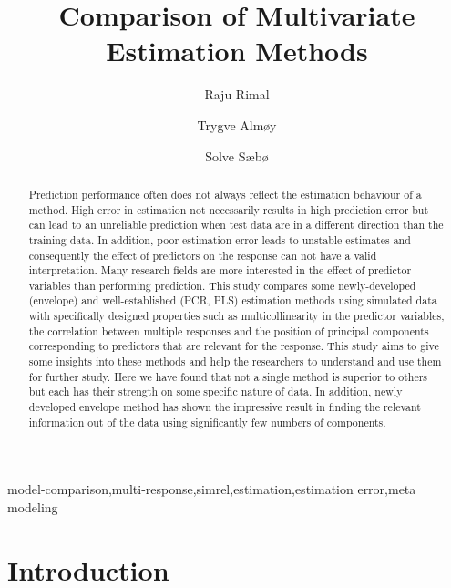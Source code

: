 \documentclass[12pt,3p,authoryear]{elsarticle}
\begin{document}
\begin{frontmatter}

  \title{Comparison of Multivariate Estimation Methods}
  
    \author[KBM]{Raju Rimal}
    \author[KBM]{Trygve Almøy}
  
    \author[NMBU]{Solve Sæbø}
  
      \address[KBM]{Faculty of Chemistry and Bioinformatics, Norwegian University of Life Sciences, Ås, Norway}
    \address[NMBU]{Prorector, Norwegian University of Life Sciences, Ås, Norway}
  
  \begin{abstract}
  Prediction performance often does not always reflect the estimation behaviour of a method. High error in estimation not necessarily results in high prediction error but can lead to an unreliable prediction when test data are in a different direction than the training data. In addition, poor estimation error leads to unstable estimates and consequently the effect of predictors on the response can not have a valid interpretation. Many research fields are more interested in the effect of predictor variables than performing prediction. This study compares some newly-developed (envelope) and well-established (PCR, PLS) estimation methods using simulated data with specifically designed properties such as multicollinearity in the predictor variables, the correlation between multiple responses and the position of principal components corresponding to predictors that are relevant for the response. This study aims to give some insights into these methods and help the researchers to understand and use them for further study. Here we have found that not a single method is superior to others but each has their strength on some specific nature of data. In addition, newly developed envelope method has shown the impressive result in finding the relevant information out of the data using significantly few numbers of components.
  \end{abstract}
   \begin{keyword} model-comparison,multi-response,simrel,estimation,estimation error,meta modeling\end{keyword}

\end{frontmatter}

\hypertarget{introduction}{%
\section{Introduction}\label{introduction}}
\end{document}
